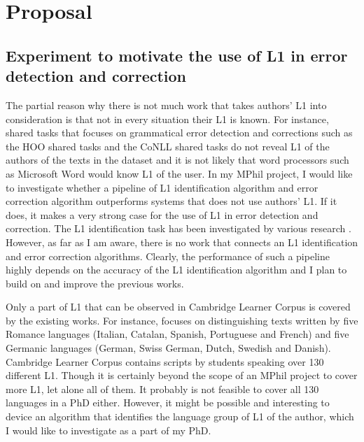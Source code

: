 \documentclass[11pt]{article}
\begin{document}
\section{Proposal}
\subsection{Experiment to motivate the use of L1 in error detection and correction}
\label{sub:experiment}
The partial reason why there is not much work that takes authors' L1 into consideration is that not in every situation their L1 is known. For instance, shared tasks that focuses on grammatical error detection and corrections such as the HOO shared tasks and the CoNLL shared tasks do not reveal L1 of the authors of the texts in the dataset and it is not likely that word processors such as Microsoft Word would know L1 of the user. In my MPhil project, I would like to investigate whether a pipeline of L1 identification algorithm and error correction algorithm outperforms systems that does not use authors' L1. If it does, it makes a very strong case for the use of L1 in error detection and correction. The L1 identification task has been investigated by various research \citep{estival2007author, tomokiyo2001you, koppel2005determining, koppel2005automatically, wong2009contrastive, kochmar2011identification}. However, as far as I am aware, there is no work that connects an L1 identification and error correction algorithms. Clearly, the performance of such a pipeline highly depends on the accuracy of the L1 identification algorithm and I plan to build on and improve the previous works.

Only a part of L1 that can be observed in Cambridge Learner Corpus is covered by the existing works. For instance, \cite{kochmar2011identification} focuses on distinguishing texts written by five Romance languages (Italian, Catalan, Spanish, Portuguese and French) and five Germanic languages (German, Swiss German, Dutch, Swedish and Danish). Cambridge Learner Corpus contains scripts by students speaking over 130 different L1. Though it is certainly beyond the scope of an MPhil project to cover more L1, let alone all of them. It probably is not feasible to cover all 130 languages in a PhD either. However, it might be possible and interesting to device an algorithm that identifies the language group of L1 of the author, which I would like to investigate as a part of my PhD.
\end{document}
